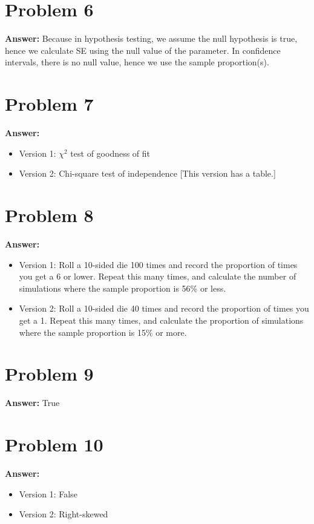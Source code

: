 \documentclass[11pt]{article}
\begin{document}
\section*{Problem 6}
\label{sec:org3a83d68}

\textbf{Answer:} Because in hypothesis testing, we assume the null hypothesis is true,
hence we calculate SE using the null value of the parameter. In confidence
intervals, there is no null value, hence we use the sample proportion(s).
\section*{Problem 7}
\label{sec:orga38473e}

\textbf{Answer:}
\begin{itemize}
\item Version 1: \(\chi^2\) test of goodness of fit
\item Version 2: Chi-square test of independence [This version has a table.]
\end{itemize}
\section*{Problem 8}
\label{sec:org2c94082}

\textbf{Answer:}
\begin{itemize}
\item Version 1: Roll a 10-sided die 100 times and record the proportion of times
you get a 6 or lower. Repeat this many times, and calculate the number of
simulations where the sample proportion is 56\% or less.
\item Version 2: Roll a 10-sided die 40 times and record the proportion of times you
get a 1. Repeat this many times, and calculate the proportion of simulations
where the sample proportion is 15\% or more.
\end{itemize}
\section*{Problem 9}
\label{sec:org537972e}

\textbf{Answer:} True
\section*{Problem 10}
\label{sec:orgb81724b}

\textbf{Answer:}
\begin{itemize}
\item Version 1: False
\item Version 2: Right-skewed
\end{itemize}
\end{document}
